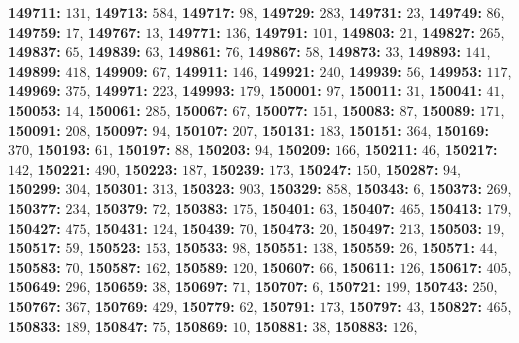 \textsf{\bfseries 149711:} $131$, \textsf{\bfseries 149713:} $584$, \textsf{\bfseries 149717:} $98$, \textsf{\bfseries 149729:} $283$, \textsf{\bfseries 149731:} $23$, \textsf{\bfseries 149749:} $86$, \textsf{\bfseries 149759:} $17$, \textsf{\bfseries 149767:} $13$, \textsf{\bfseries 149771:} $136$, \textsf{\bfseries 149791:} $101$, \textsf{\bfseries 149803:} $21$, \textsf{\bfseries 149827:} $265$, \textsf{\bfseries 149837:} $65$, \textsf{\bfseries 149839:} $63$, \textsf{\bfseries 149861:} $76$, \textsf{\bfseries 149867:} $58$, \textsf{\bfseries 149873:} $33$, \textsf{\bfseries 149893:} $141$, \textsf{\bfseries 149899:} $418$, \textsf{\bfseries 149909:} $67$, \textsf{\bfseries 149911:} $146$, \textsf{\bfseries 149921:} $240$, \textsf{\bfseries 149939:} $56$, \textsf{\bfseries 149953:} $117$, \textsf{\bfseries 149969:} $375$, \textsf{\bfseries 149971:} $223$, \textsf{\bfseries 149993:} $179$, \textsf{\bfseries 150001:} $97$, \textsf{\bfseries 150011:} $31$, \textsf{\bfseries 150041:} $41$, \textsf{\bfseries 150053:} $14$, \textsf{\bfseries 150061:} $285$, \textsf{\bfseries 150067:} $67$, \textsf{\bfseries 150077:} $151$, \textsf{\bfseries 150083:} $87$, \textsf{\bfseries 150089:} $171$, \textsf{\bfseries 150091:} $208$, \textsf{\bfseries 150097:} $94$, \textsf{\bfseries 150107:} $207$, \textsf{\bfseries 150131:} $183$, \textsf{\bfseries 150151:} $364$, \textsf{\bfseries 150169:} $370$, \textsf{\bfseries 150193:} $61$, \textsf{\bfseries 150197:} $88$, \textsf{\bfseries 150203:} $94$, \textsf{\bfseries 150209:} $166$, \textsf{\bfseries 150211:} $46$, \textsf{\bfseries 150217:} $142$, \textsf{\bfseries 150221:} $490$, \textsf{\bfseries 150223:} $187$, \textsf{\bfseries 150239:} $173$, \textsf{\bfseries 150247:} $150$, \textsf{\bfseries 150287:} $94$, \textsf{\bfseries 150299:} $304$, \textsf{\bfseries 150301:} $313$, \textsf{\bfseries 150323:} $903$, \textsf{\bfseries 150329:} $858$, \textsf{\bfseries 150343:} $6$, \textsf{\bfseries 150373:} $269$, \textsf{\bfseries 150377:} $234$, \textsf{\bfseries 150379:} $72$, \textsf{\bfseries 150383:} $175$, \textsf{\bfseries 150401:} $63$, \textsf{\bfseries 150407:} $465$, \textsf{\bfseries 150413:} $179$, \textsf{\bfseries 150427:} $475$, \textsf{\bfseries 150431:} $124$, \textsf{\bfseries 150439:} $70$, \textsf{\bfseries 150473:} $20$, \textsf{\bfseries 150497:} $213$, \textsf{\bfseries 150503:} $19$, \textsf{\bfseries 150517:} $59$, \textsf{\bfseries 150523:} $153$, \textsf{\bfseries 150533:} $98$, \textsf{\bfseries 150551:} $138$, \textsf{\bfseries 150559:} $26$, \textsf{\bfseries 150571:} $44$, \textsf{\bfseries 150583:} $70$, \textsf{\bfseries 150587:} $162$, \textsf{\bfseries 150589:} $120$, \textsf{\bfseries 150607:} $66$, \textsf{\bfseries 150611:} $126$, \textsf{\bfseries 150617:} $405$, \textsf{\bfseries 150649:} $296$, \textsf{\bfseries 150659:} $38$, \textsf{\bfseries 150697:} $71$, \textsf{\bfseries 150707:} $6$, \textsf{\bfseries 150721:} $199$, \textsf{\bfseries 150743:} $250$, \textsf{\bfseries 150767:} $367$, \textsf{\bfseries 150769:} $429$, \textsf{\bfseries 150779:} $62$, \textsf{\bfseries 150791:} $173$, \textsf{\bfseries 150797:} $43$, \textsf{\bfseries 150827:} $465$, \textsf{\bfseries 150833:} $189$, \textsf{\bfseries 150847:} $75$, \textsf{\bfseries 150869:} $10$, \textsf{\bfseries 150881:} $38$, \textsf{\bfseries 150883:} $126$, 
